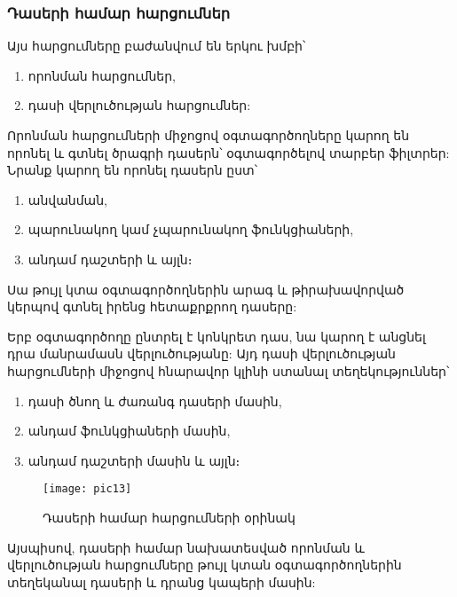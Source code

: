 \subsubsection*{Դասերի համար հարցումներ}\label{subsubsec:classes}

Այս հարցումները բաժանվում են երկու խմբի՝
\begin{enumerate}
    \item որոնման հարցումներ,
    \item դասի վերլուծության հարցումներ:
\end{enumerate}

Որոնման հարցումների միջոցով օգտագործողները կարող են որոնել և գտնել ծրագրի դասերն՝ օգտագործելով տարբեր ֆիլտրեր:
Նրանք կարող են որոնել դասերն ըստ՝
\begin{enumerate}
    \item անվանման,
    \item պարունակող կամ չպարունակող ֆունկցիաների,
    \item անդամ դաշտերի և այլն։
\end{enumerate}

Սա թույլ կտա օգտագործողներին արագ և թիրախավորված կերպով գտնել իրենց հետաքրքրող դասերը:

Երբ օգտագործողը ընտրել է կոնկրետ դաս, նա կարող է անցնել դրա մանրամասն վերլուծությանը: Այդ դասի վերլուծության
հարցումների միջոցով հնարավոր կլինի ստանալ տեղեկություններ՝
\begin{enumerate}
    \item դասի ծնող և ժառանգ դասերի մասին,
    \item անդամ ֆունկցիաների մասին,
    \item անդամ դաշտերի մասին և այլն։
\end{enumerate}

\begin{figure}[h]
    \centering
    \texttt{[image: pic13]}
    \caption{Դասերի համար հարցումների օրինակ}
    \label{fig:figure13}
\end{figure}

Այսպիսով, դասերի համար նախատեսված որոնման և վերլուծության հարցումները թույլ կտան օգտագործողներին տեղեկանալ դասերի
և դրանց կապերի մասին:
